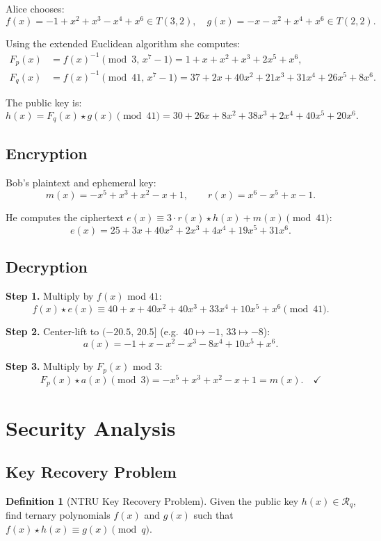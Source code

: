 \documentclass[12pt, a4paper]{article}
\theoremstyle{definition}
\newtheorem{definition}{Definition}[section]
\theoremstyle{plain}
\newcommand{\R}{\mathcal{R}}
\begin{document}
Alice chooses:
\[
    f(x) = -1 + x^2 + x^3 - x^4 + x^6 \in T(3,2), \quad
    g(x) = -x - x^2 + x^4 + x^6 \in T(2,2).
\]

Using the extended Euclidean algorithm she computes:
\begin{align*}
    F_p(x) &= f(x)^{-1} \pmod{3,\, x^7-1}
            = 1 + x + x^2 + x^3 + 2x^5 + x^6, \\
    F_q(x) &= f(x)^{-1} \pmod{41,\, x^7-1}
            = 37 + 2x + 40x^2 + 21x^3 + 31x^4 + 26x^5 + 8x^6.
\end{align*}

The public key is:
\[
    h(x) = F_q(x) \star g(x) \pmod{41}
         = 30 + 26x + 8x^2 + 38x^3 + 2x^4 + 40x^5 + 20x^6.
\]

\subsection{Encryption}

Bob's plaintext and ephemeral key:
\[
    m(x) = -x^5 + x^3 + x^2 - x + 1, \qquad r(x) = x^6 - x^5 + x - 1.
\]

He computes the ciphertext $e(x) \equiv 3 \cdot r(x) \star h(x) + m(x) \pmod{41}$:
\[
    e(x) = 25 + 3x + 40x^2 + 2x^3 + 4x^4 + 19x^5 + 31x^6.
\]

\subsection{Decryption}

\textbf{Step 1.} Multiply by $f(x)$ mod $41$:
\[
    f(x) \star e(x) \equiv 40 + x + 40x^2 + 40x^3 + 33x^4 + 10x^5 + x^6 \pmod{41}.
\]

\textbf{Step 2.} Center-lift to $(-20.5,\, 20.5]$ (e.g.\ $40 \mapsto -1$,
$33 \mapsto -8$):
\[
    a(x) = -1 + x - x^2 - x^3 - 8x^4 + 10x^5 + x^6.
\]

\textbf{Step 3.} Multiply by $F_p(x)$ mod $3$:
\[
    F_p(x) \star a(x) \pmod{3} = -x^5 + x^3 + x^2 - x + 1 = m(x). \quad \checkmark
\]

\section{Security Analysis}\label{sec:security}

\subsection{Key Recovery Problem}

\begin{definition}[NTRU Key Recovery Problem]
    Given the public key $h(x) \in \R_q$, find ternary polynomials $f(x)$ and
    $g(x)$ such that $f(x) \star h(x) \equiv g(x) \pmod{q}$.
\end{definition}
\end{document}

